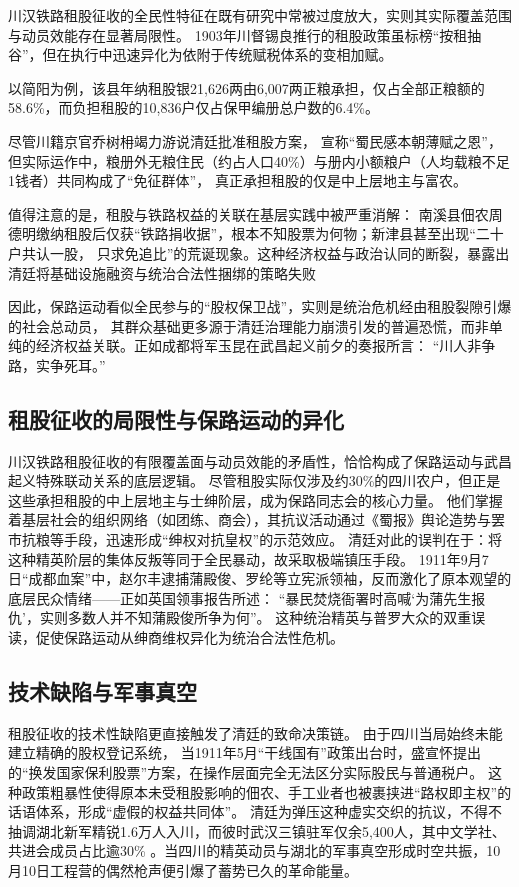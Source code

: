 川汉铁路租股征收的全民性特征在既有研究中常被过度放大，实则其实际覆盖范围与动员效能存在显著局限性。
1903年川督锡良推行的租股政策虽标榜“按租抽谷”，但在执行中迅速异化为依附于传统赋税体系的变相加赋。

以简阳为例，该县年纳租股银21,626两由6,007两正粮承担，仅占全部正粮额的58.6\%，而负担租股的10,836户仅占保甲编册总户数的6.4\%。

尽管川籍京官乔树枏竭力游说清廷批准租股方案，
宣称“蜀民感本朝薄赋之恩”，但实际运作中，粮册外无粮住民（约占人口40\%）与册内小额粮户（人均载粮不足1钱者）共同构成了“免征群体”，
真正承担租股的仅是中上层地主与富农。

值得注意的是，租股与铁路权益的关联在基层实践中被严重消解：
南溪县佃农周德明缴纳租股后仅获“铁路捐收据”，根本不知股票为何物；新津县甚至出现“二十户共认一股，
只求免追比”的荒诞现象。这种经济权益与政治认同的断裂，暴露出清廷将基础设施融资与统治合法性捆绑的策略失败

因此，保路运动看似全民参与的“股权保卫战”，实则是统治危机经由租股裂隙引爆的社会总动员，
其群众基础更多源于清廷治理能力崩溃引发的普遍恐慌，而非单纯的经济权益关联。正如成都将军玉昆在武昌起义前夕的奏报所言：
“川人非争路，实争死耳。”
\subsection{租股征收的局限性与保路运动的异化}
川汉铁路租股征收的有限覆盖面与动员效能的矛盾性，恰恰构成了保路运动与武昌起义特殊联动关系的底层逻辑。
尽管租股实际仅涉及约30\%的四川农户，但正是这些承担租股的中上层地主与士绅阶层，成为保路同志会的核心力量。
他们掌握着基层社会的组织网络（如团练、商会），其抗议活动通过《蜀报》舆论造势与罢市抗粮等手段，迅速形成“绅权对抗皇权”的示范效应。
清廷对此的误判在于：将这种精英阶层的集体反叛等同于全民暴动，故采取极端镇压手段。
1911年9月7日“成都血案”中，赵尔丰逮捕蒲殿俊、罗纶等立宪派领袖，反而激化了原本观望的底层民众情绪——正如英国领事报告所述：
“暴民焚烧衙署时高喊‘为蒲先生报仇’，实则多数人并不知蒲殿俊所争为何”。
这种统治精英与普罗大众的双重误读，促使保路运动从绅商维权异化为统治合法性危机。

\subsection{技术缺陷与军事真空}
租股征收的技术性缺陷更直接触发了清廷的致命决策链。
由于四川当局始终未能建立精确的股权登记系统\autocite{chuanhan}，
当1911年5月“干线国有”政策出台时，盛宣怀提出的“换发国家保利股票”方案，在操作层面完全无法区分实际股民与普通税户。
这种政策粗暴性使得原本未受租股影响的佃农、手工业者也被裹挟进“路权即主权”的话语体系，形成“虚假的权益共同体”。
清廷为弹压这种虚实交织的抗议，不得不抽调湖北新军精锐1.6万人入川，而彼时武汉三镇驻军仅余5,400人，其中文学社、共进会成员占比逾30\%
\autocite{He2006Xinhai}。当四川的精英动员与湖北的军事真空形成时空共振，10月10日工程营的偶然枪声便引爆了蓄势已久的革命能量。

